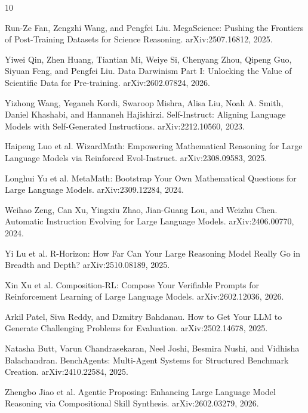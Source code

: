 \documentclass[11pt]{ctexart}
\begin{document}
\begin{thebibliography}{10}

Run-Ze Fan, Zengzhi Wang, and Pengfei Liu.
\newblock MegaScience: Pushing the Frontiers of Post-Training Datasets for Science Reasoning.
\newblock arXiv:2507.16812, 2025.

Yiwei Qin, Zhen Huang, Tiantian Mi, Weiye Si, Chenyang Zhou, Qipeng Guo, Siyuan Feng, and Pengfei Liu.
\newblock Data Darwinism Part I: Unlocking the Value of Scientific Data for Pre-training.
\newblock arXiv:2602.07824, 2026.

Yizhong Wang, Yeganeh Kordi, Swaroop Mishra, Alisa Liu, Noah A. Smith, Daniel Khashabi, and Hannaneh Hajishirzi.
\newblock Self-Instruct: Aligning Language Models with Self-Generated Instructions.
\newblock arXiv:2212.10560, 2023.

Haipeng Luo et al.
\newblock WizardMath: Empowering Mathematical Reasoning for Large Language Models via Reinforced Evol-Instruct.
\newblock arXiv:2308.09583, 2025.

Longhui Yu et al.
\newblock MetaMath: Bootstrap Your Own Mathematical Questions for Large Language Models.
\newblock arXiv:2309.12284, 2024.

Weihao Zeng, Can Xu, Yingxiu Zhao, Jian-Guang Lou, and Weizhu Chen.
\newblock Automatic Instruction Evolving for Large Language Models.
\newblock arXiv:2406.00770, 2024.

Yi Lu et al.
\newblock R-Horizon: How Far Can Your Large Reasoning Model Really Go in Breadth and Depth?
\newblock arXiv:2510.08189, 2025.

Xin Xu et al.
\newblock Composition-RL: Compose Your Verifiable Prompts for Reinforcement Learning of Large Language Models.
\newblock arXiv:2602.12036, 2026.

Arkil Patel, Siva Reddy, and Dzmitry Bahdanau.
\newblock How to Get Your LLM to Generate Challenging Problems for Evaluation.
\newblock arXiv:2502.14678, 2025.

Natasha Butt, Varun Chandrasekaran, Neel Joshi, Besmira Nushi, and Vidhisha Balachandran.
\newblock BenchAgents: Multi-Agent Systems for Structured Benchmark Creation.
\newblock arXiv:2410.22584, 2025.

Zhengbo Jiao et al.
\newblock Agentic Proposing: Enhancing Large Language Model Reasoning via Compositional Skill Synthesis.
\newblock arXiv:2602.03279, 2026.

\end{thebibliography}
\end{document}
